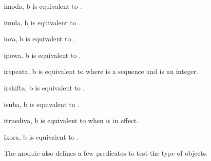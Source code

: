 \begin{funcdesc}{imod}{a, b}
 is equivalent to .
\end{funcdesc}

\begin{funcdesc}{imul}{a, b}
 is equivalent to .
\end{funcdesc}

\begin{funcdesc}{ior}{a, b}
 is equivalent to .
\end{funcdesc}

\begin{funcdesc}{ipow}{a, b}
 is equivalent to .
\end{funcdesc}

\begin{funcdesc}{irepeat}{a, b}
 is equivalent to  where
 is a sequence and  is an integer.
\end{funcdesc}

\begin{funcdesc}{irshift}{a, b}
 is equivalent to .
\end{funcdesc}

\begin{funcdesc}{isub}{a, b}
 is equivalent to .
\end{funcdesc}

\begin{funcdesc}{itruediv}{a, b}
 is equivalent to  when
 is in effect.
\end{funcdesc}

\begin{funcdesc}{ixor}{a, b}
 is equivalent to .
\end{funcdesc}


The  module also defines a few predicates to test the
type of objects.  

